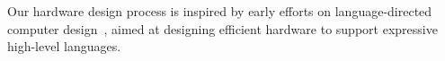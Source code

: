 Our hardware design process is inspired by early
efforts on language-directed computer
design~\cite{language-directed-computer-design, ditzel_patterson, soar},
aimed at designing efficient hardware to support expressive high-level languages.
